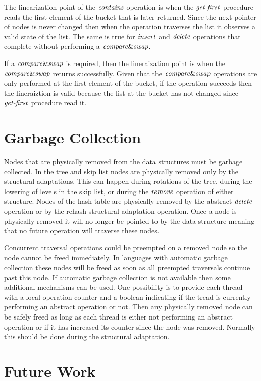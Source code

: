 The linearization point of the $\ms{contains}$ operation is when the $\ms{get-first}$ procedure reads the first element of the
bucket that is later returned.
Since the next pointer of nodes is never changed then when the operation traverses the list it observes a valid state of the list.
The same is true for $\ms{insert}$ and $\ms{delete}$ operations that complete without performing a $\ms{compare\&swap}$.

If a $\ms{compare\&swap}$ is required, then the lineraization point is when the $\ms{compare\&swap}$ returns successfully.
Given that the $\ms{compare\&swap}$ operations are only performed at the first element of the bucket, if the operation succeeds then
the lineraiztion is valid because
the list at the bucket has not changed since $\ms{get-first}$ procedure read it.





\section{Garbage Collection}
Nodes that are physically removed from the data structures must be garbage collected.
In the tree and skip list nodes are physically removed only by the structural adaptations.
This can happen during rotations of the tree, during the lowering of levels in the skip list,
or during the $\ms{remove}$ operation of either structure.
Nodes of the hash table are physically removed by the abstract $\ms{delete}$ operation or by the rehash structural adaptation operation.
Once a node is physically removed it will no longer be pointed to by the data structure meaning that no future operation
will traverse these nodes.

Concurrent traversal operations could be preempted on a removed node so the node cannot be freed immediately.
In languages with automatic garbage collection these nodes will be freed as soon as all preempted traversals continue past this node.
If automatic garbage collection is not available then some additional mechanisms can be used.
One possibility is to provide each thread with a local operation counter and a boolean indicating if the tread is currently performing
an abstract operation or not.
Then any physically removed node can be safely freed as long as each thread is either not performing an abstract operation or if it has increased its
counter since the node was removed.
Normally this should be done during the structural adaptation.

\section{Future Work}

